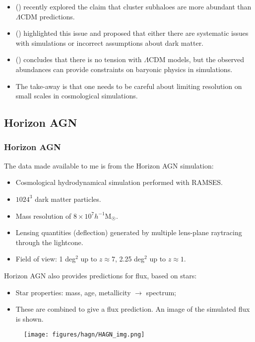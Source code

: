 \documentclass{beamer}
\begin{document}
  \begin{frame}
    \begin{itemize}
      \item (\cite{bah2021}) recently explored the claim that cluster subhaloes are more abundant than $\Lambda$CDM predictions.
      \item (\cite{M20}) highlighted this issue and proposed that either there are systematic issues with simulations or incorrect assumptions about dark matter.
      \item (\cite{bah2021}) concludes that there is no tension with $\Lambda$CDM models, but the observed abundances can provide constraints on baryonic physics in simulations.
      \item The take-away is that one needs to be careful about limiting resolution on small scales in cosmological simulations.
    \end{itemize}
  \end{frame}

  \subsection{Horizon AGN}

  \begin{frame}
    \frametitle{\sc Horizon AGN}
    The data made available to me is from the Horizon AGN simulation:
    \begin{itemize}
      \item Cosmological hydrodynamical simulation performed with RAMSES.
      \item $1024^3$ dark matter particles.
      \item Mass resolution of $8\times 10^7 h^{-1} \text{M}_{\astrosun}$.
      \item Lensing quantities (deflection) generated by multiple lens-plane raytracing through the lightcone.
      \item Field of view: 1 deg$^2$ up to $z\approx 7$, 2.25 deg$^2$ up to $z\approx 1$.
    \end{itemize}
  \end{frame}

  \begin{frame}
    Horizon AGN also provides predictions for flux, based on stars:
    \begin{itemize}
      \item Star properties: mass, age, metallicity $\rightarrow$ spectrum;
      \item These are combined to give a flux prediction. An image of the simulated flux is shown.
    \end{itemize}
    \begin{figure}
      \centering
      \texttt{[image: figures/hagn/HAGN\_img.png]}
    \end{figure}
  \end{frame}
\end{document}
